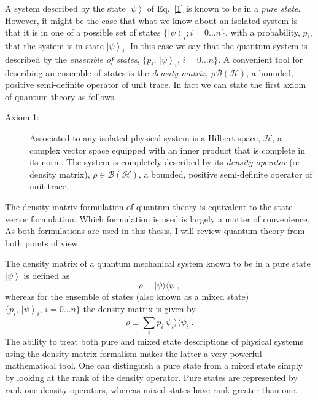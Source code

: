 \documentclass{article}
\newcommand{\ket}[1]{\left|#1\right\rangle}
\newcommand\defn[1]{\textsl{#1}}
\newcommand\ketbra[1]{|#1\rangle\langle#1|}
\newcommand\cH{{\mathscr{H}}}
\newcommand\cB{{\mathcal B}}
\begin{document}
A system described by the state $\ket{\psi}$ of Eq.~\eqref{1} is known to be in a \defn{pure state}.  However, it might be the case that what we know about an isolated system is that it is in one of a possible set of states $\{\ket{\psi}_i; i=0\ldots n\}$, with a probability, $p_i$, that the system is in state $\ket{\psi}_i$.  In this case we say that the quantum system is described by the \defn{ensemble of states}, $\{p_i,\,\ket{\psi}_i, \, i=0\ldots n\}$.  A convenient tool for describing an ensemble of states is the \defn{density matrix}, $\rho\cB(\cH)$, a bounded, positive semi-definite operator of unit trace.  In fact we can state the first axiom of quantum theory as follows. 
\begin{description}
 \item[Axiom 1:]  Associated to any isolated physical system is a Hilbert space,
$\cH$, a complex vector space equipped with an inner product that is complete in its norm.  The system is completely described by its \defn{density operator} (or density matrix), $\rho\in \cB(\cH)$, a bounded, positive semi-definite operator of unit trace.
\end{description}

The density matrix formulation of quantum theory is equivalent to the state vector formulation.  Which formulation is used is largely a matter of convenience.  As both formulations are used in this thesis, I will review quantum theory from both points of view. 
  
The density matrix of a quantum mechanical system known to be in a pure state
$\ket{\psi}$ is defined as
\begin{equation}
 \rho\equiv \ketbra{\psi},
\label{2}
\end{equation}
whereas for the ensemble of states (also known as a mixed state) $\{p_i,\,\ket{\psi}_i, \, i=0\ldots n\}$ the density matrix is given by
\begin{equation}
 \rho\equiv\sum_i p_i\ketbra{\psi_i}.
\label{3}
\end{equation}
The ability to treat both pure and mixed state descriptions of physical systems using the density matrix formalism makes the latter a very powerful mathematical tool.  One can distinguish a pure 
state from a mixed state simply by looking at the rank of the density operator. 
Pure states are represented by rank-one density operators, whereas mixed states have rank greater than one.
\end{document}
